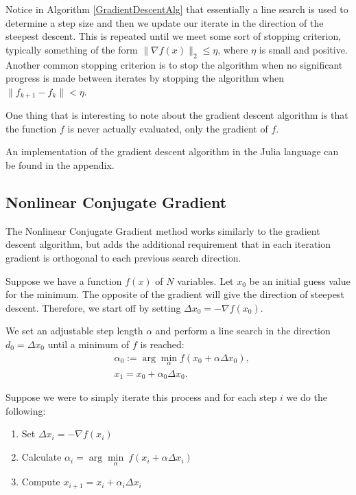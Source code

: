 Notice in Algorithm \ref{GradientDescentAlg} that essentially a line search is used to determine a step size and then we update our iterate in the direction of the steepest descent. This is repeated until we meet some sort of stopping criterion, typically something of the form $\|\nabla f(x)\|_2\leq\eta$, where $\eta$ is small and positive. Another common stopping criterion is to stop the algorithm when no significant progress is made between iterates by stopping the algorithm when $\|f_{k+1}-f_{k}\|<\eta$.

One thing that is interesting to note about the gradient descent algorithm is that the function $f$ is never actually evaluated, only the gradient of $f$.

An implementation of the gradient descent algorithm in the Julia language can be found in the appendix.

\subsection{Nonlinear Conjugate Gradient}

The Nonlinear Conjugate Gradient method works similarly to the gradient descent algorithm, but adds the additional requirement that in each iteration gradient is orthogonal to each previous search direction.

Suppose we have a function $f(x)$ of $N$ variables. Let $x_0$ be an initial guess value for the minimum. The opposite of the gradient will give the direction of steepest descent. Therefore, we start off by setting $\Delta x_0=-\nabla f(x_0)$.

We set an adjustable step length $\alpha$ and perform a line search in the direction $d_0=\Delta x_0$ until a minimum of $f$ is reached:
\begin{align*}
	&\alpha_0:=\arg\min_{\alpha} f(x_0+\alpha\Delta x_0),\\
	&x_1=x_0+\alpha_0\Delta x_0.
\end{align*}

Suppose we were to simply iterate this process and for each step $i$ we do the following:

\begin{enumerate}
	\item Set $\Delta x_i=-\nabla f(x_i)$
	\item Calculate $\alpha_i=\arg\underset{\alpha}{\min}\ f(x_i+\alpha\Delta x_i)$
	\item Compute $x_{i+1}=x_i+\alpha_i\Delta x_i$
\end{enumerate}

